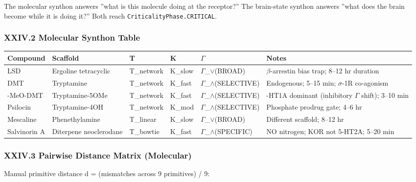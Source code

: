 \documentclass[12pt,a4paper]{article}
\begin{document}
The molecular synthon answers ''what is this molecule doing at the receptor?'' The brain-state synthon answers ''what does the brain become while it is doing it?'' Both reach \texttt{CriticalityPhase.CRITICAL}.

\subsubsection{XXIV.2 Molecular Synthon Table}

\begin{table}[htbp]
\centering
\small
{}
\begin{tabularx}{\textwidth}{>{\centering\arraybackslash}X >{\centering\arraybackslash}X >{\centering\arraybackslash}X >{\centering\arraybackslash}X >{\centering\arraybackslash}X >{\centering\arraybackslash}X}
\toprule
\rowcolor{gray!25}\textbf{Compound} & \textbf{Scaffold} & \textbf{T} & \textbf{K} & \textbf{$\Gamma$} & \textbf{Notes} \\
\midrule
\rowcolors{1}{white}{gray!10}
LSD & Ergoline tetracyclic & T\_network & K\_slow & $\Gamma$\_$\lor$(BROAD) & $\beta$-arrestin bias trap; 8--12 hr duration \\
DMT & Tryptamine & T\_network & K\_fast & $\Gamma$\_$\land$(SELECTIVE) & Endogenous; 5--15 min; $\sigma$-1R co-agonism \\
5-MeO-DMT & Tryptamine-5OMe & T\_network & K\_fast & $\Gamma$\_$\land$(SELECTIVE) & 5-HT1A dominant (inhibitory $\Gamma$ shift); 3--10 min \\
Psilocin & Tryptamine-4OH & T\_network & K\_mod & $\Gamma$\_$\land$(SELECTIVE) & Phosphate prodrug gate; 4--6 hr \\
Mescaline & Phenethylamine & T\_linear & K\_slow & $\Gamma$\_$\lor$(BROAD) & Different scaffold; 8--12 hr \\
Salvinorin A & Diterpene neoclerodane & T\_bowtie & K\_fast & $\Gamma$\_$\land$(SPECIFIC) & NO nitrogen; KOR not 5-HT2A; 5--20 min \\
\bottomrule
\end{tabularx}
\end{table}

\subsubsection{XXIV.3 Pairwise Distance Matrix (Molecular)}

Manual primitive distance d = (mismatches across 9 primitives) / 9:
\end{document}
